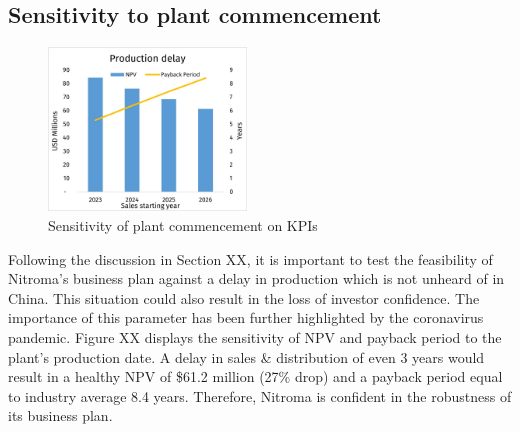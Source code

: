 \subsection{Sensitivity to plant commencement}
\begin{figure}
    \caption{Sensitivity of plant commencement on KPIs}
    \label{Sensitivity_ProductionDelay}
    \includegraphics[width=0.47\textwidth]{chapters/6-economics/figures/Sensitivity_ProductionDelay.jpg}
\end{figure}
Following the discussion in Section XX, it is important to test the feasibility of Nitroma’s business plan against a delay in production which is not unheard of in China.  This situation could also result in the loss of investor confidence. The importance of this parameter has been further highlighted by the coronavirus pandemic. Figure XX displays the sensitivity of NPV and payback period to the plant’s production date. A delay in sales \& distribution of even 3 years would result in a healthy NPV of \$61.2 million (27\% drop) and a payback period equal to industry average 8.4 years. Therefore, Nitroma is confident in the robustness of its business plan.

